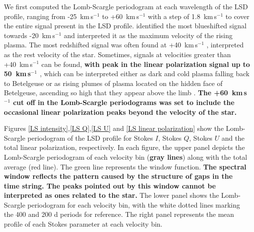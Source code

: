 \documentclass{aa}
\def\kms {km\,s$^{-1}$ }
\begin{document}
We first computed the Lomb-Scargle periodogram at each wavelength of the LSD profile, ranging from -25~\kms to +60~\kms with a step of 1.8~\kms to cover the entire 
signal present in the LSD profile. \cite{lopez_ariste_convective_2018} identified the most blueshifted signal towards -20~\kms and interpreted it as  the maximum velocity of the rising plasma. The most redshifted signal was often found at +40~\kms, interpreted 
as the rest velocity of the star. Sometimes, signals at velocities greater than +40~\kms can be found, \textbf{with peak in the linear polarization signal up to 50~\kms \citep{lopez_ariste_three-dimensional_2022}}, which can be interpreted either as dark and cold plasma falling back to Betelgeuse or as rising plumes of plasma located on the hidden face of Betelgeuse, ascending so high that they appear above the limb \citep[for the case of the RSG $\mu$~Cep]{lopez_ariste_height_2023}. \textbf{The +60~\kms cut off in the Lomb-Scargle periodograms was set to include the occasional linear polarization peaks beyond the velocity of the star.}





Figures \ref{LS intensity},\ref{LS Q},\ref{LS U} and \ref{LS linear polarization} show the Lomb-Scargle periodogram of the LSD profile for Stokes $I$, Stokes $Q$, Stokes $U$ and the total linear polarization, respectively. 
In each figure, the upper panel depicts the Lomb-Scargle periodogram of each velocity bin (\textbf{gray lines}) along with the total average (red line). The green line represents the window function. \textbf{The spectral window reﬂects the pattern caused by the structure of gaps in the time string. The peaks pointed out by this window cannot be interpreted as ones related to the star.} The lower panel shows the Lomb-Scargle periodogram for each velocity bin, with the white dotted lines marking the 400 and 200 d periods for reference. The right panel represents the mean profile of each Stokes parameter at each velocity bin.
\end{document}
